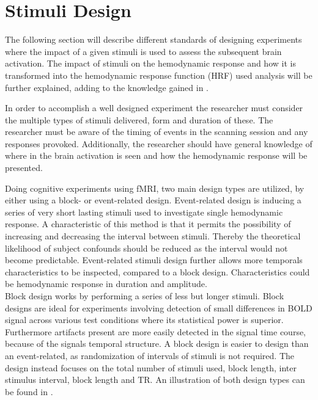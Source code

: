 \section{Stimuli Design} \label{sec:Stim}

The following section will describe different standards of designing experiments where the impact of a given stimuli is used to assess the subsequent brain activation. The impact of stimuli on the hemodynamic response and how it is transformed into the hemodynamic response function (HRF) used analysis will be further explained, adding to the knowledge gained in .

In order to accomplish a well designed experiment the researcher must consider the multiple types of stimuli delivered, form and duration of these. The researcher must be aware of the timing of events in the scanning session and any responses provoked. Additionally, the researcher should have general knowledge of where in the brain activation is seen and how the hemodynamic response will be presented. \cite{Moayedi2018} 

Doing cognitive experiments using fMRI, two main design types are utilized, by either using a block- or event-related design.   
Event-related design is inducing a series of very short lasting stimuli used to investigate single hemodynamic response. A characteristic of this method is that it permits the possibility of increasing and decreasing the interval between stimuli. Thereby the theoretical likelihood of subject confounds should be reduced as the interval would not become predictable. Event-related stimuli design further allows more temporals characteristics to be inspected, compared to a block design. Characteristics could be hemodynamic response in duration and amplitude. \cite{Chee2003}  \\
Block design works by performing a series of less but longer stimuli. Block designs are ideal for experiments involving detection of small differences in BOLD signal across various test conditions where its statistical power is superior. Furthermore artifacts present are more easily detected in the signal time course, because of the signals temporal structure. A block design is easier to design than an event-related, as randomization of intervals of stimuli is not required. The design instead focuses on the total number of stimuli used, block length, inter stimulus interval, block length and TR. An illustration of both design types can be found in . \cite{Chee2003}       

